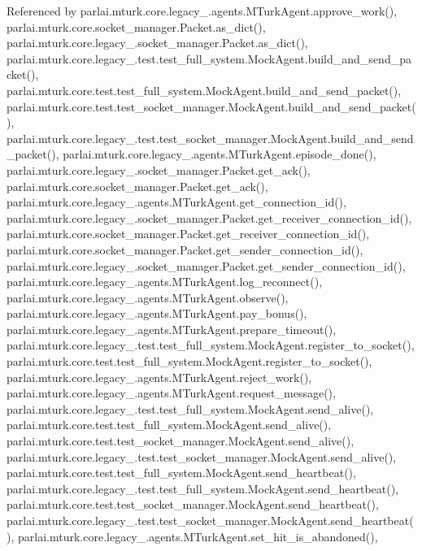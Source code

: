 Referenced by parlai.\+mturk.\+core.\+legacy\+\_.\+agents.\+M\+Turk\+Agent.\+approve\+\_\+work(), parlai.\+mturk.\+core.\+socket\+\_\+manager.\+Packet.\+as\+\_\+dict(), parlai.\+mturk.\+core.\+legacy\+\_.\+socket\+\_\+manager.\+Packet.\+as\+\_\+dict(), parlai.\+mturk.\+core.\+legacy\+\_.\+test.\+test\+\_\+full\+\_\+system.\+Mock\+Agent.\+build\+\_\+and\+\_\+send\+\_\+packet(), parlai.\+mturk.\+core.\+test.\+test\+\_\+full\+\_\+system.\+Mock\+Agent.\+build\+\_\+and\+\_\+send\+\_\+packet(), parlai.\+mturk.\+core.\+test.\+test\+\_\+socket\+\_\+manager.\+Mock\+Agent.\+build\+\_\+and\+\_\+send\+\_\+packet(), parlai.\+mturk.\+core.\+legacy\+\_.\+test.\+test\+\_\+socket\+\_\+manager.\+Mock\+Agent.\+build\+\_\+and\+\_\+send\+\_\+packet(), parlai.\+mturk.\+core.\+legacy\+\_.\+agents.\+M\+Turk\+Agent.\+episode\+\_\+done(), parlai.\+mturk.\+core.\+legacy\+\_.\+socket\+\_\+manager.\+Packet.\+get\+\_\+ack(), parlai.\+mturk.\+core.\+socket\+\_\+manager.\+Packet.\+get\+\_\+ack(), parlai.\+mturk.\+core.\+legacy\+\_.\+agents.\+M\+Turk\+Agent.\+get\+\_\+connection\+\_\+id(), parlai.\+mturk.\+core.\+legacy\+\_.\+socket\+\_\+manager.\+Packet.\+get\+\_\+receiver\+\_\+connection\+\_\+id(), parlai.\+mturk.\+core.\+socket\+\_\+manager.\+Packet.\+get\+\_\+receiver\+\_\+connection\+\_\+id(), parlai.\+mturk.\+core.\+socket\+\_\+manager.\+Packet.\+get\+\_\+sender\+\_\+connection\+\_\+id(), parlai.\+mturk.\+core.\+legacy\+\_.\+socket\+\_\+manager.\+Packet.\+get\+\_\+sender\+\_\+connection\+\_\+id(), parlai.\+mturk.\+core.\+legacy\+\_.\+agents.\+M\+Turk\+Agent.\+log\+\_\+reconnect(), parlai.\+mturk.\+core.\+legacy\+\_.\+agents.\+M\+Turk\+Agent.\+observe(), parlai.\+mturk.\+core.\+legacy\+\_.\+agents.\+M\+Turk\+Agent.\+pay\+\_\+bonus(), parlai.\+mturk.\+core.\+legacy\+\_.\+agents.\+M\+Turk\+Agent.\+prepare\+\_\+timeout(), parlai.\+mturk.\+core.\+legacy\+\_.\+test.\+test\+\_\+full\+\_\+system.\+Mock\+Agent.\+register\+\_\+to\+\_\+socket(), parlai.\+mturk.\+core.\+test.\+test\+\_\+full\+\_\+system.\+Mock\+Agent.\+register\+\_\+to\+\_\+socket(), parlai.\+mturk.\+core.\+legacy\+\_.\+agents.\+M\+Turk\+Agent.\+reject\+\_\+work(), parlai.\+mturk.\+core.\+legacy\+\_.\+agents.\+M\+Turk\+Agent.\+request\+\_\+message(), parlai.\+mturk.\+core.\+legacy\+\_.\+test.\+test\+\_\+full\+\_\+system.\+Mock\+Agent.\+send\+\_\+alive(), parlai.\+mturk.\+core.\+test.\+test\+\_\+full\+\_\+system.\+Mock\+Agent.\+send\+\_\+alive(), parlai.\+mturk.\+core.\+test.\+test\+\_\+socket\+\_\+manager.\+Mock\+Agent.\+send\+\_\+alive(), parlai.\+mturk.\+core.\+legacy\+\_.\+test.\+test\+\_\+socket\+\_\+manager.\+Mock\+Agent.\+send\+\_\+alive(), parlai.\+mturk.\+core.\+test.\+test\+\_\+full\+\_\+system.\+Mock\+Agent.\+send\+\_\+heartbeat(), parlai.\+mturk.\+core.\+legacy\+\_.\+test.\+test\+\_\+full\+\_\+system.\+Mock\+Agent.\+send\+\_\+heartbeat(), parlai.\+mturk.\+core.\+test.\+test\+\_\+socket\+\_\+manager.\+Mock\+Agent.\+send\+\_\+heartbeat(), parlai.\+mturk.\+core.\+legacy\+\_.\+test.\+test\+\_\+socket\+\_\+manager.\+Mock\+Agent.\+send\+\_\+heartbeat(), parlai.\+mturk.\+core.\+legacy\+\_.\+agents.\+M\+Turk\+Agent.\+set\+\_\+hit\+\_\+is\+\_\+abandoned(), 